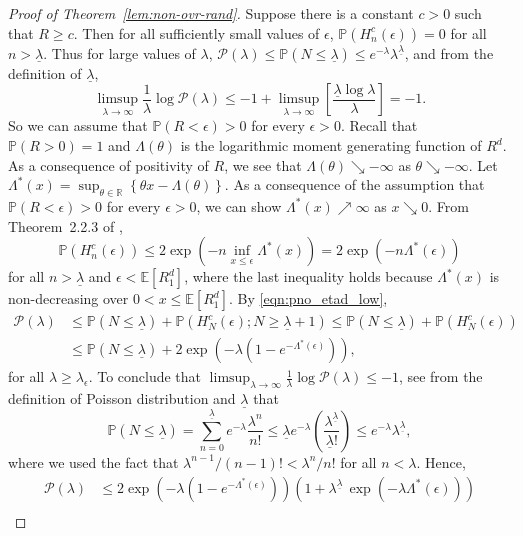\documentclass[11pt]{article}
\newcommand{\pp}{\mathbb{P}}
\newcommand{\ee}{\mathbb{E}}
\newcommand{\reals}{\mathbb{R}}
\newcommand{\lt}{\left}
\newcommand{\rt}{\right}
\newcommand{\pno}{\mathcal{P}(\lambda)}
\begin{document}
\begin{appendices}
\begin{proof}[Proof of Theorem~\ref{lem:non-ovr-rand}]
Suppose there is a constant $c > 0$ such that $R \geq c$. Then for all sufficiently small values of $\epsilon$,
$\pp\lt(H^c_n\lt(\epsilon\rt) \rt) = 0$ for all $n > \underline{\lambda}$.  Thus for large values of $\lambda$, $\pno \leq \pp \lt( N \leq \underline{\lambda}\rt) \leq e^{-\lambda} \lambda^{\underline{\lambda}}$, and from the definition of $\underline{\lambda}$,
\[
\limsup_{\lambda \rightarrow \infty} \frac{1}{\lambda} \log \pno \leq - 1 + \limsup_{\lambda \rightarrow \infty} \lt[\frac{\underline{\lambda} \log \lambda}{\lambda} \rt] = -1.
\]
So we can assume that $\pp(R < \epsilon)> 0$ for every $\epsilon> 0$. Recall that $\pp(R > 0) = 1$ and  $\Lambda(\theta)$ is the logarithmic moment generating function of $R^d$. As a consequence of positivity of $R$, we see that $\Lambda(\theta) \searrow -\infty$ as $\theta \searrow -\infty$.
Let $\Lambda^*(x) = \sup_{\theta \in \reals} \lt\{\theta x - \Lambda(\theta)\rt\}$. As a consequence of the assumption that $\pp(R < \epsilon)> 0$ for every $\epsilon> 0$,
we can show $\Lambda^*(x) \nearrow \infty$ as $x \searrow 0$. From
Theorem~2.2.3 of \cite{DZ10},
$$\pp\lt(H^c_n\lt( \epsilon\rt) \rt) \leq 2 \exp\lt( - n \inf_{x \leq \epsilon} \Lambda^*(x)\rt) = 2 \exp\lt( - n \Lambda^*(\epsilon)\rt)$$ for all $n > \underline{\lambda}$ and $\epsilon < \ee[R_1^d]$, where the last inequality holds because $\Lambda^*(x)$ is non-decreasing over $0 < x \leq \ee[R_1^d]$. By \eqref{eqn:pno_etad_low},
\begin{align*}
\pno &\leq \pp \lt( N \leq \underline{\lambda}\rt) + \pp \lt(H^c_N\lt(\epsilon\rt); N \geq \underline{\lambda} + 1\rt) \leq \pp \lt( N \leq \underline{\lambda}\rt) + \pp \lt(H^c_N\lt(\epsilon\rt)\rt)\\
&\leq \pp \lt( N \leq \underline{\lambda}\rt) + 2\exp\lt(- \lambda\lt(1 - e^{-\Lambda^*(\epsilon)} \rt) \rt),
\end{align*}
for all $\lambda \geq \lambda_\epsilon$. To conclude that $\limsup_{\lambda \rightarrow \infty} \frac{1}{\lambda} \log \pno \leq -1$, see from the definition of Poisson distribution and $\underline{\lambda}$ that
$$\pp \lt( N \leq \underline{\lambda}\rt) = \sum_{n= 0}^{\underline{\lambda}} e^{-\lambda} \frac{\lambda^n}{n!} \leq \underline{\lambda} e^{-\lambda} \lt(\frac{\lambda^{\underline{\lambda}}}{\underline{\lambda}!}\rt) \leq e^{-\lambda} \lambda^{\underline{\lambda}},$$ where we used the fact that $\lambda^{n-1}/(n-1)! < \lambda^{n}/n!$ for all $n < \lambda$. Hence,
\begin{align*}
\pno &\leq 2\exp\lt(- \lambda\lt(1 - e^{-\Lambda^*(\epsilon)} \rt) \rt) \lt( 1 + \lambda^{\underline{\lambda}} \, \exp\lt(- \lambda\Lambda^*(\epsilon)\rt)\rt)\\

\end{align*}
\end{proof}
\end{appendices}
\end{document}
